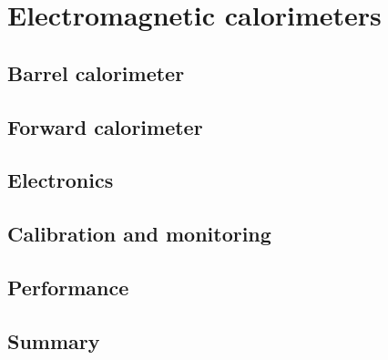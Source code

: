\section{Electromagnetic calorimeters \label{sec:calorimeters}}
\subsection{Barrel calorimeter \label{sec:bcal}}
\subsection{Forward calorimeter \label{sec:fcal}}
\subsection{Electronics \label{sec:calelectronics}}
\subsection{Calibration and monitoring \label{sec:calcalib}}
\subsection{Performance \label{sec:calperformance}}
\subsection{Summary \label{sec:calsummary}}